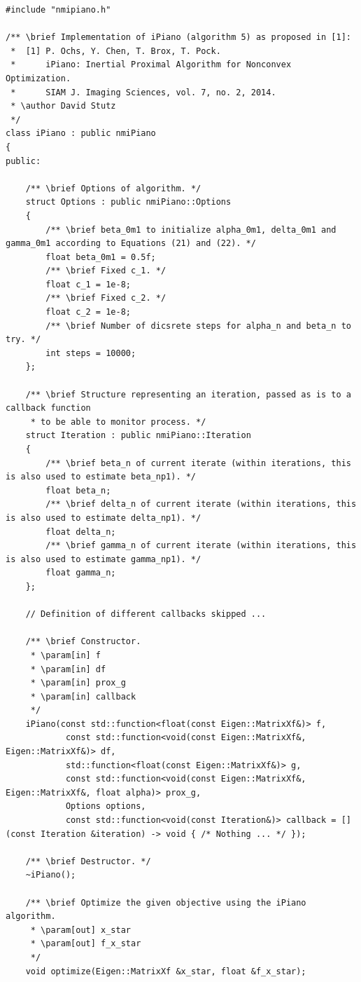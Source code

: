 \documentclass[onecolumn,final,a4paper,13pt,reqno]{siamart}
\begin{document}
\begin{appendix}
\begin{lstlisting}
#include "nmipiano.h"

/** \brief Implementation of iPiano (algorithm 5) as proposed in [1]:
 *  [1] P. Ochs, Y. Chen, T. Brox, T. Pock.
 *      iPiano: Inertial Proximal Algorithm for Nonconvex Optimization.
 *      SIAM J. Imaging Sciences, vol. 7, no. 2, 2014.
 * \author David Stutz
 */
class iPiano : public nmiPiano
{
public:
    
    /** \brief Options of algorithm. */
    struct Options : public nmiPiano::Options
    {
        /** \brief beta_0m1 to initialize alpha_0m1, delta_0m1 and gamma_0m1 according to Equations (21) and (22). */
        float beta_0m1 = 0.5f;
        /** \brief Fixed c_1. */
        float c_1 = 1e-8;
        /** \brief Fixed c_2. */
        float c_2 = 1e-8;
        /** \brief Number of dicsrete steps for alpha_n and beta_n to try. */
        int steps = 10000;
    };
    
    /** \brief Structure representing an iteration, passed as is to a callback function
     * to be able to monitor process. */
    struct Iteration : public nmiPiano::Iteration
    {
        /** \brief beta_n of current iterate (within iterations, this is also used to estimate beta_np1). */
        float beta_n;
        /** \brief delta_n of current iterate (within iterations, this is also used to estimate delta_np1). */
        float delta_n;
        /** \brief gamma_n of current iterate (within iterations, this is also used to estimate gamma_np1). */
        float gamma_n;
    };
    
    // Definition of different callbacks skipped ...
    
    /** \brief Constructor.
     * \param[in] f
     * \param[in] df
     * \param[in] prox_g
     * \param[in] callback
     */
    iPiano(const std::function<float(const Eigen::MatrixXf&)> f, 
            const std::function<void(const Eigen::MatrixXf&, Eigen::MatrixXf&)> df,
            std::function<float(const Eigen::MatrixXf&)> g,
            const std::function<void(const Eigen::MatrixXf&, Eigen::MatrixXf&, float alpha)> prox_g,
            Options options,
            const std::function<void(const Iteration&)> callback = [](const Iteration &iteration) -> void { /* Nothing ... */ });
            
    /** \brief Destructor. */
    ~iPiano();
    
    /** \brief Optimize the given objective using the iPiano algorithm. 
     * \param[out] x_star
     * \param[out] f_x_star
     */
    void optimize(Eigen::MatrixXf &x_star, float &f_x_star);
    

\end{lstlisting}
\end{appendix}
\end{document}
